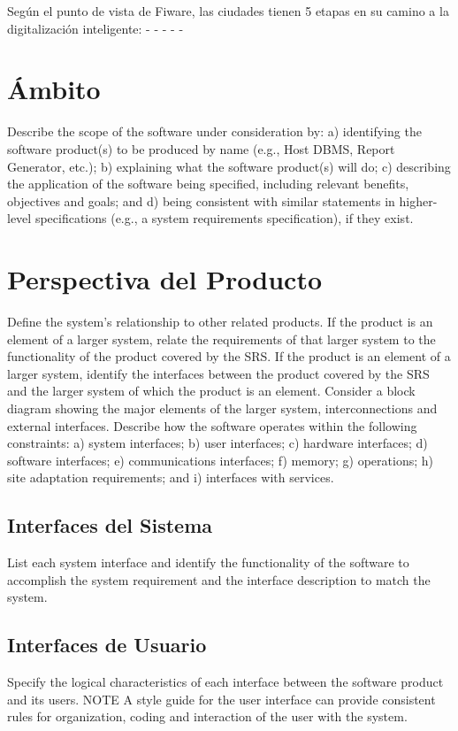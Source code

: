 \documentclass[12pt, a4paper, twoside]{article}
\begin{document}
Según el punto de vista de Fiware, las ciudades tienen 5 etapas en su camino a la digitalización inteligente:
 -
 -
 -
 -
 -



 \section{Ámbito}
 Describe the scope of the software under consideration by:
 a) identifying the software product(s) to be produced by name (e.g., Host DBMS, Report Generator, etc.);
 b) explaining what the software product(s) will do;
 c) describing the application of the software being specified, including relevant benefits, objectives
 and goals; and
 d) being consistent with similar statements in higher-level specifications (e.g., a system requirements
 specification), if they exist.

 \section{Perspectiva del Producto}
 Define the system's relationship to other related products.
 If the product is an element of a larger system, relate the requirements of that larger system to the
 functionality of the product covered by the SRS.
 If the product is an element of a larger system, identify the interfaces between the product covered by
 the SRS and the larger system of which the product is an element.
 Consider a block diagram showing the major elements of the larger system, interconnections and
 external interfaces.
 Describe how the software operates within the following constraints:
 a) system interfaces;
 b) user interfaces;
 c) hardware interfaces;
 d) software interfaces;
 e) communications interfaces;
 f) memory;
 g) operations;
 h) site adaptation requirements; and
 i) interfaces with services.

 \subsection{Interfaces del Sistema}
 List each system interface and identify the functionality of the software to accomplish the system
 requirement and the interface description to match the system.

 \subsection{Interfaces de Usuario}
 Specify the logical characteristics of each interface between the software product and its users.
 NOTE A style guide for the user interface can provide consistent rules for organization, coding and
 interaction of the user with the system.
\end{document}
